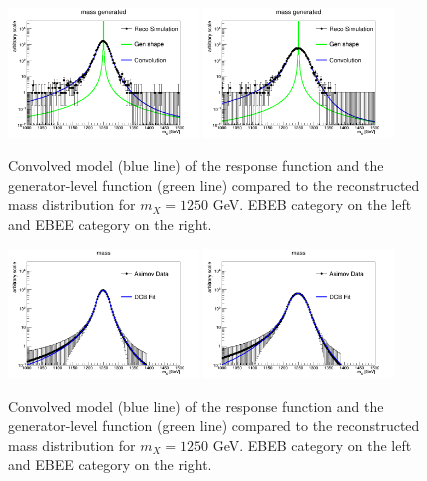 \begin{figure}[!h]
 \begin{center}
\includegraphics[width=0.45\textwidth]{figures/diphotons/mreco_EBEB016_M1250_k001_log.png}
\includegraphics[width=0.45\textwidth]{figures/diphotons/mreco_EBEE016_M1250_k001_log.png}
  \caption{Convolved model (blue line) of the response function and the generator-level function (green line) compared to the reconstructed mass distribution for $m_X=1250$ GeV. EBEB category on the left and EBEE category on the right.}
 \label{fig:reco1250}
 \end{center}
\end{figure}
  
\begin{figure}[!h]
 \begin{center}
\includegraphics[width=0.45\textwidth]{figures/diphotons/fitasimov_EBEB016_M1250_k001_log.png}
\includegraphics[width=0.45\textwidth]{figures/diphotons/fitasimov_EBEE016_M1250_k001_log.png}
  \caption{Convolved model (blue line) of the response function and the generator-level function (green line) compared to the reconstructed mass distribution  for $m_X=1250$ GeV. EBEB category on the left and EBEE category on the right.}
 \label{fig:final1250}
 \end{center}
\end{figure}

